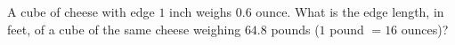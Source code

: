 A cube of cheese with edge $1$ inch weighs $0.6$ ounce. What is the edge length, in feet, of a cube of the same cheese weighing $64.8$ pounds ($1$ pound $=16$ ounces)?
